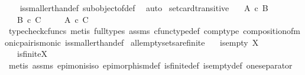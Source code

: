 \begin{isabellebody}
%
\isadelimproof
\ \ %
\endisadelimproof
%
\isatagproof
{}\isamarkupfalse%
\ is{\isacharunderscore}{\kern0pt}smaller{\isacharunderscore}{\kern0pt}than{\isacharunderscore}{\kern0pt}def\ subobject{\isacharunderscore}{\kern0pt}of{\isacharunderscore}{\kern0pt}def{}\ \isamarkupfalse%
\ auto%
\endisatagproof
{\isafoldproof}%
%
\isadelimproof
\isanewline
%
\endisadelimproof
\isanewline
{}\isamarkupfalse%
\ set{\isacharunderscore}{\kern0pt}card{\isacharunderscore}{\kern0pt}transitive{\isacharcolon}{\kern0pt}\isanewline
\ \ \ {\isachardoublequoteopen}A\ {\isasymle}\isactrlsub c\ B{\isachardoublequoteclose}\isanewline
\ \ \ {\isachardoublequoteopen}B\ {\isasymle}\isactrlsub c\ C{\isachardoublequoteclose}\isanewline
\ \ \ \ \ {\isachardoublequoteopen}A\ {\isasymle}\isactrlsub c\ C{\isachardoublequoteclose}\isanewline
%
\isadelimproof
\ \ %
\endisadelimproof
%
\isatagproof
{}\isamarkupfalse%
\ {\isacharparenleft}{\kern0pt}typecheck{\isacharunderscore}{\kern0pt}cfuncs{\isacharcomma}{\kern0pt}\ metis\ {\isacharparenleft}{\kern0pt}full{\isacharunderscore}{\kern0pt}types{\isacharparenright}{\kern0pt}\ assms\ cfunc{\isacharunderscore}{\kern0pt}type{\isacharunderscore}{\kern0pt}def\ comp{\isacharunderscore}{\kern0pt}type\ composition{\isacharunderscore}{\kern0pt}of{\isacharunderscore}{\kern0pt}monic{\isacharunderscore}{\kern0pt}pair{\isacharunderscore}{\kern0pt}is{\isacharunderscore}{\kern0pt}monic\ is{\isacharunderscore}{\kern0pt}smaller{\isacharunderscore}{\kern0pt}than{\isacharunderscore}{\kern0pt}def{\isacharparenright}{\kern0pt}%
\endisatagproof
{\isafoldproof}%
%
\isadelimproof
\isanewline
%
\endisadelimproof
\isanewline
{}\isamarkupfalse%
\ all{\isacharunderscore}{\kern0pt}emptysets{\isacharunderscore}{\kern0pt}are{\isacharunderscore}{\kern0pt}finite{\isacharcolon}{\kern0pt}\isanewline
\ \ \ {\isachardoublequoteopen}is{\isacharunderscore}{\kern0pt}empty\ X{\isachardoublequoteclose}\isanewline
\ \ \ {\isachardoublequoteopen}is{\isacharunderscore}{\kern0pt}finite{\isacharparenleft}{\kern0pt}X{\isacharparenright}{\kern0pt}{\isachardoublequoteclose}\isanewline
%
\isadelimproof
\ \ %
\endisadelimproof
%
\isatagproof
{}\isamarkupfalse%
\ {\isacharparenleft}{\kern0pt}metis\ assms\ epi{\isacharunderscore}{\kern0pt}mon{\isacharunderscore}{\kern0pt}is{\isacharunderscore}{\kern0pt}iso\ epimorphism{\isacharunderscore}{\kern0pt}def{}\ is{\isacharunderscore}{\kern0pt}finite{\isacharunderscore}{\kern0pt}def\ is{\isacharunderscore}{\kern0pt}empty{\isacharunderscore}{\kern0pt}def\ one{\isacharunderscore}{\kern0pt}separator{\isacharparenright}{\kern0pt}%

\end{isabellebody}
